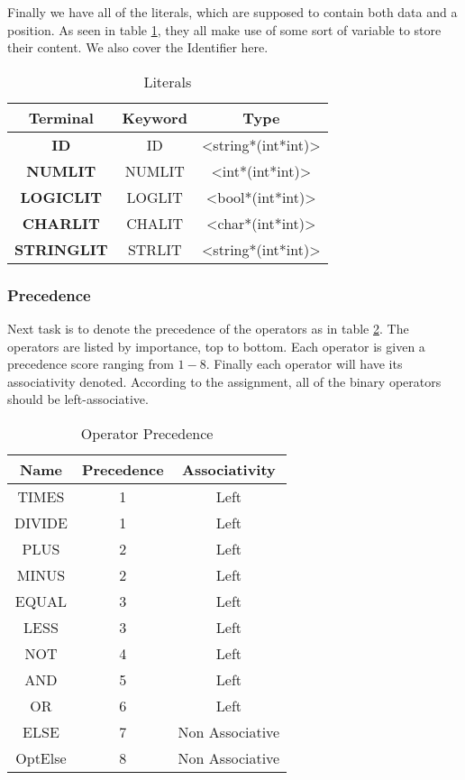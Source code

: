 \documentclass[10pt]{article}
\begin{document}
Finally we have all of the literals, which are supposed to contain both data and a position. As seen in table \ref{tab:literals}, they all make use of some sort of variable to store their content. We also cover the Identifier here.

\begin{table}[!h]
\centering
\begin{tabular}{|c|c|c|}
Terminal & Keyword & Type\\
\hline
\textbf{ID} & ID & <string*(int*int)>\\
\textbf{NUMLIT} & NUMLIT & <int*(int*int)>\\
\textbf{LOGICLIT} & LOGLIT & <bool*(int*int)> \\
\textbf{CHARLIT} & CHALIT & <char*(int*int)> \\
\textbf{STRINGLIT} & STRLIT & <string*(int*int)> \\
\hline
\end{tabular}
\caption{\label{tab:literals}Literals}
\end{table}

\subsubsection{Precedence}
Next task is to denote the precedence of the operators as in table \ref{tab:op_precedence}. The operators are listed by importance, top to bottom. Each operator is given a precedence score ranging from \(1-8\). Finally each operator will have its associativity denoted. According to the assignment, all of the binary operators should be left-associative.

\begin{table}
\begin{center}
\begin{tabular}{|c|c|c|}
\hline
Name & Precedence & Associativity\\
\hline
TIMES & 1 & Left\\
DIVIDE & 1 & Left\\
PLUS & 2 & Left\\
MINUS & 2 & Left\\
EQUAL & 3 & Left\\
LESS & 3 & Left\\
NOT & 4 & Left\\
AND & 5 & Left\\
OR & 6 & Left\\
ELSE & 7 & Non Associative\\
OptElse & 8 & Non Associative\\
\hline
\end{tabular}
\end{center}
\caption{\label{tab:op_precedence}Operator Precedence}
\end{table}
\end{document}
